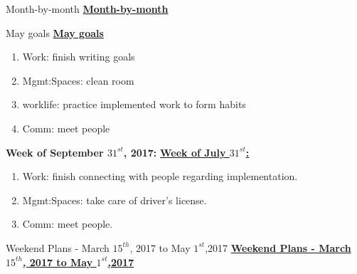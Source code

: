 \begin{multicols}{4}
\begin{columns}
\begin{column}{0.5\columnwidth}
\ifdefined\POSTER
    \begin{block}{Month-by-month}
\else
\underline{\bf Month-by-month}
\fi
      \begin{itemize}

\ifdefined\POSTER
\begin{block}{May goals}
\else
\underline{\bf May goals}\\
\fi

\begin{enumerate}
\item \small Work: finish writing goals
  \small \item \small Mgmt:Spaces: clean room
\item \small worklife: practice implemented work to form habits
\item \small Comm: meet people
\end{enumerate}

\ifdefined\POSTER
\end{block}
\fi

\ifdefined\POSTER
\begin{block}{\small \bf Week of September $31^{st}$, 2017:}
\else
\underline{\bf Week of July $31^{st}$: }\\
\fi

\begin{enumerate}
\tiny \item \tiny Work: finish connecting with people regarding implementation.
\item \tiny Mgmt:Spaces: take care of driver's license.
\item \tiny Comm: meet people.
\end{enumerate}

\ifdefined\POSTER
\end{block}
\fi

\ifdefined\POSTER
\begin{block}{Weekend Plans - March $15^{th}$, 2017 to May $1^{st}$,2017}
\else
{\underline{\bf Weekend Plans - March $15^{th}$, 2017 to May $1^{st}$,2017}}\\
\fi




\end{block}
\end{itemize}
\end{block}
\end{column}
\end{columns}
\end{multicols}
